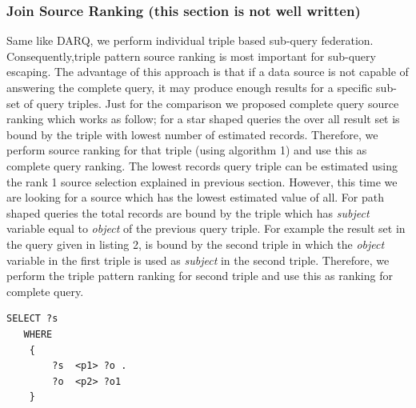 \documentclass{sig-alternate}  %
\begin{document}
\subsubsection{Join Source Ranking (this section is not well written)}
Same like DARQ, we perform individual triple based sub-query federation. Consequently,triple pattern source ranking is most important for sub-query escaping. The advantage of this approach is that if a data source is not capable of answering the complete query, it may produce enough results for a specific sub-set of query triples. Just for the comparison we proposed complete query source ranking which works as follow; for a star shaped queries the over all result set is bound by the triple with lowest number of estimated records. Therefore, we perform source ranking for that triple (using algorithm 1) and use this as complete query ranking. The lowest records query triple can be estimated using the rank 1 source selection explained in previous section. However, this time we are looking for a source which has the lowest estimated value of all. For path shaped queries the total records are bound by the triple which has \emph{subject} variable equal to \emph{object} of the previous query triple. For example the result set in the query given in listing 2, is bound by the second triple in which the \emph{object} variable in the first triple is used as \emph{subject} in the second triple. Therefore, we perform the triple pattern ranking for second triple and use this as ranking for complete query.
\begin{lstlisting}[caption = {A P-1 query example},frame = {single},stringstyle={\ttfamily}]
 SELECT ?s 
   WHERE
    {
        ?s  <p1> ?o .
        ?o  <p2> ?o1
    }
\end{lstlisting}
\end{document}
